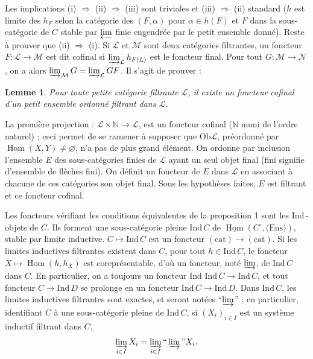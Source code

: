 \documentclass[12pt]{amsart}
\theoremstyle{plain}
\newtheorem{lem}[prop]{Lemme}
\theoremstyle{definition}
\DeclareMathOperator{\Hom}{Hom}
\newcommand{\Ind}{\text{Ind}\,}
\newcommand{\cL}{\mathcal{L}}
\newcommand{\cM}{\mathcal{M}}
\newcommand{\cN}{\mathcal{N}}
\newcommand{\cD}{D}
\begin{document}
Les implications (i) $\Rightarrow$ (ii) $\Rightarrow$ (iii) sont triviales et (iii) $\Rightarrow$ (ii) standard ($h$ est limite des $h_{F}$ selon la cat\'egorie des $(F,\alpha)$ pour $\alpha \in h(F)$ et $F$ dans la sous-cat\'egorie de $C$ stable par $\varprojlim$ finie engendr\'ee par le petit ensemble donn\'e). Reste \`a prouver que (ii) $\Rightarrow$ (i). Si $\cL$ et $\cM$ sont deux cat\'egories filtrantes, un foncteur $F: \cL \to \cM$ est dit cofinal si $\varinjlim_{\cL} h_{F(L)}$ est le foncteur final. Pour tout $G: \cM \to \cN$, on a alors $\varinjlim_{\cM} G = \varinjlim_{\cL} GF$. Il s'agit de prouver :

\begin{lem}
Pour toute petite cat\'egorie filtrante $\cL$, il existe un foncteur cofinal d'un petit ensemble ordonn\'e filtrant dans $\cL$.
\end{lem}

La premi\`ere projection : $\cL \times \mathbb{N} \to \cL$, est un foncteur cofinal ($\mathbb{N}$ muni de l'ordre naturel) ; ceci permet de se ramener \`a supposer que $\text{Ob}\cL$, pr\'eordonn\'e par $\Hom(X,Y) \neq \varnothing$, n'a pas de plus grand \'el\'ement. On ordonne par inclusion l'ensemble $E$ des sous-cat\'egories finies de $\cL$ ayant un seul objet final (fini signifie d'ensemble de fl\`eches fini). On d\'efinit un foncteur de $E$ dans $\cL$ en associant \`a chacune de ces cat\'egories son objet final. Sous les hypoth\`eses faites, $E$ est filtrant et ce foncteur cofinal.

Les foncteurs v\'erifiant les conditions \'equivalentes de la proposition 1 sont les $\Ind$-objets de $C$. Ils forment une sous-cat\'egorie pleine $\Ind C$ de $\underline{\Hom}(C^{\circ},\text{(Ens)})$, stable par limite inductive. $C \mapsto \Ind C$ est un foncteur $(\text{cat}) \to (\text{cat})$. Si les limites inductives filtrantes existent dans $C$, pour tout $h \in \Ind C$, le foncteur $X \mapsto \Hom(h,h_{X})$ est corepr\'esentable, d'o\`u un foncteur, not\'e $\varinjlim$, de $\Ind C$ dans $C$. En particulier, on a toujours un foncteur $\Ind\,\Ind C \to \Ind C$, et tout foncteur $C \to \Ind\cD$ se prolonge en un foncteur $\Ind C \to \Ind\cD$. Dans $\Ind C$, les limites inductives filtrantes sont exactes, et seront not\'ees ``$\varinjlim$'' ; en particulier, identifiant $C$ \`a une sous-cat\'egorie pleine de $\Ind C$, si $(X_{i})_{i \in I}$ est un syst\`eme inductif filtrant dans $C$,
\[
\varinjlim_{i \in I} X_{i} = \varinjlim_{i \in I} \text{``}\varinjlim\text{''} X_{i}.
\]
\end{document}
